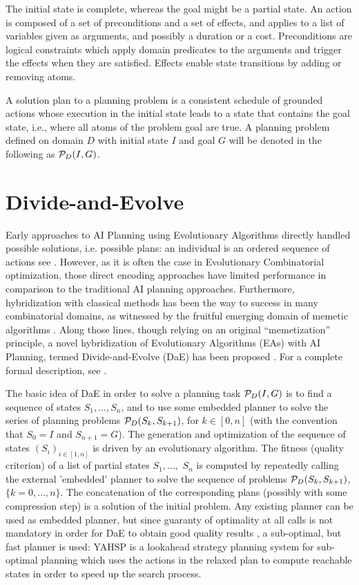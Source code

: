 \documentclass[letterpaper]{article}
\begin{document}
The initial state is complete, whereas the goal might be a partial state. An action is composed of a set of preconditions and a set of effects, and applies to a list of variables given as arguments, and possibly a duration or a cost. Preconditions are logical constraints which apply domain predicates to the arguments and trigger the effects when they are satisfied. Effects enable state transitions by adding or removing atoms.

A solution plan to a planning problem is a consistent schedule of grounded actions whose execution in the initial state leads to a state that contains the goal state, i.e., where all atoms of the problem goal are true. A planning problem defined on domain $D$ with initial state $I$ and goal $G$ will be denoted in the following as ${\cal P}_D(I,G)$.

\section{Divide-and-Evolve}

\label{section:dae}

Early approaches to AI Planning using Evolutionary Algorithms directly handled possible solutions, i.e. possible plans: an individual is an ordered sequence of actions see \cite{Spector-AAAI-94,muslea97,westerberg:2001,Morignot-2005}. However, as it is often the case in Evolutionary Combinatorial optimization, those direct encoding approaches have limited performance in comparison to the traditional AI planning approaches. Furthermore, hybridization with classical methods has been the way to success in many combinatorial domains, as witnessed by the fruitful emerging domain of memetic algorithms \cite{MemeticBook:2005}. Along those lines, though relying on an original ``memetization'' principle, a novel hybridization of Evolutionary Algorithms (EAs) with AI Planning, termed Divide-and-Evolve (DaE) has been proposed \cite{DAE:EvoCOP06,DAE:book-2007}. For a complete formal description, see \cite{Bibai:ICAPS2010}.

The basic idea of DaE in order to solve a planning task ${\cal P}_D(I,G)$ is to find a sequence of states $S_1, \ldots, S_n$, and to use some embedded planner to solve the series of planning problems ${\cal P}_D(S_{k},S_{k+1})$, for $k \in [0,n]$ (with the convention that $S_0 = I$ and $S_{n+1} = G$). The generation and optimization of the sequence of states $(S_i)_{i \in [1,n]}$ is driven by an evolutionary algorithm. 
The fitness (quality criterion) of a list of partial states $S_1, \ldots,$ $S_n$ is computed by repeatedly calling the external 'embedded' planner to solve the sequence of problems ${\cal P}_D(S_{k},S_{k+1})$, $\{k=0,\ldots,n\}$. The concatenation of the corresponding plans (possibly with some compression step) is a solution of the initial problem. Any existing planner can be used as embedded planner, but since guaranty of optimality at all calls is not mandatory in order for DaE to obtain good quality results \cite{Bibai:ICAPS2010}, a sub-optimal, but fast planner is used: YAHSP \cite{V:icaps04} is a lookahead strategy planning system for sub-optimal planning which uses the  actions in the relaxed plan to compute reachable states in order to speed up the search process. 
\end{document}
